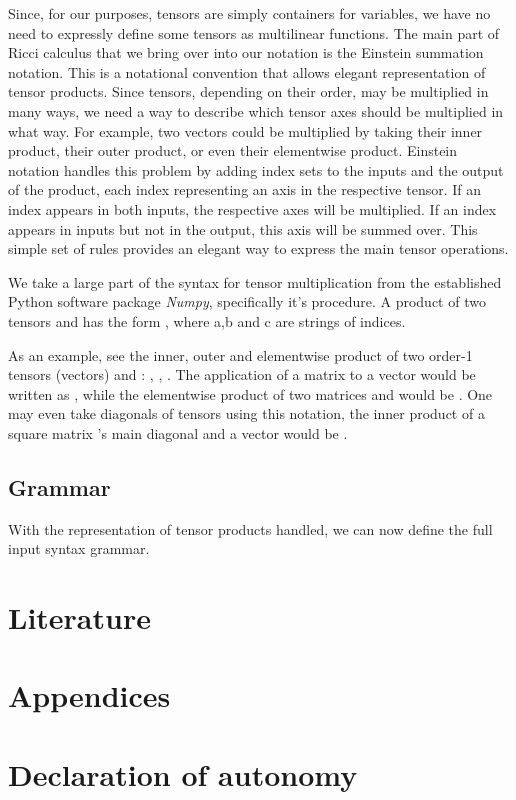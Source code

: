\documentclass[12pt, a4paper]{report}
\begin{document}
Since, for our purposes, tensors are simply containers for variables, we have no need to expressly define some tensors as multilinear functions.
The main part of Ricci calculus that we bring over into our notation is the Einstein summation notation.
This is a notational convention that allows elegant representation of tensor products.
Since tensors, depending on their order, may be multiplied in many ways, we need a way to describe which tensor axes should be multiplied in what way.
For example, two vectors could be multiplied by taking their inner product, their outer product, or even their elementwise product.
Einstein notation handles this problem by adding index sets to the inputs and the output of the product, each index representing an axis in the respective tensor.
If an index appears in both inputs, the respective axes will be multiplied.
If an index appears in inputs but not in the output, this axis will be summed over.
This simple set of rules provides an elegant way to express the main tensor operations.

We take a large part of the syntax for tensor multiplication from the established Python software package \textit{Numpy}, specifically it's  procedure.
A product of two tensors  and  has the form , where a,b and c are strings of indices.

As an example, see the inner, outer and elementwise product of two order-1 tensors (vectors)  and : , , .
The application of a matrix  to a vector  would be written as , while the elementwise product of two matrices  and  would be .
One may even take diagonals of tensors using this notation, the inner product of a square matrix 's main diagonal and a vector  would be .


\section {Grammar}
With the representation of tensor products handled, we can now define the full input syntax grammar.

\chapter{Literature}
\chapter{Appendices}
\chapter{Declaration of autonomy}
\end{document}
